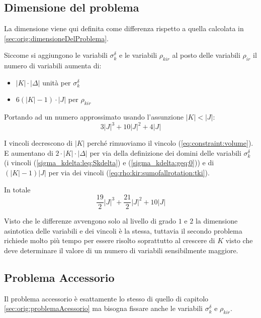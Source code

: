 \documentclass{scrartcl}
\begin{document}
\subsection{Dimensione del problema}

La dimensione viene qui definita come differenza rispetto a quella calcolata in \ref{sec:orig:dimensioneDelProblema}.

Siccome si aggiungono le variabili $\sigma_k^\delta$ e le variabili $\rho_{kir}$ al posto delle variabili $\rho_{ir}$ il numero di variabili aumenta di:
\begin{itemize}
	\item $|K|\cdot|\Delta|$ unità per $\sigma_k^\delta$
	
	\item $6(|K|-1)\cdot |J|$ per $\rho_{kir}$
\end{itemize} 

Portando ad un numero approssimato usando l'assunzione $|K| < |J|$:
$$
3|J|^3 + 10|J|^2 + 4|J| 
$$


I vincoli decrescono di $|K|$ perché rimuoviamo il vincolo (\ref{eq:constraint:volume}). E aumentano di $2 \cdot |K|\cdot|\Delta|$ per via della definizione dei domini delle variabili $\sigma_k^\delta$ (i vincoli (\ref{sigma_kdelta:leq:Skdelta}) e (\ref{sigma_kdelta:geq:0})) e di $(|K|-1) |J|$ per via dei vincoli (\ref{eq:rho:kir:sumofallrotation:tki}).

In totale
$$
\frac{19}{2} |J|^3 + \frac{21}{2} |J|^2 + 10|J|
$$


Visto che le differenze avvengono solo al livello di grado $1$ e $2$ la dimensione asintotica delle variabili e dei vincoli è la stessa, tuttavia il secondo problema richiede molto più tempo per essere risolto soprattutto al crescere di $K$ visto che deve determinare il valore di un numero di variabili sensibilmente maggiore.


\subsection{Problema Accessorio}

Il problema accessorio è esattamente lo stesso di quello di capitolo \ref{sec:orig:problemaAcessorio} ma bisogna fissare anche le variabili $\sigma_k^\delta$ e $\rho_{kir}$.
\end{document}
